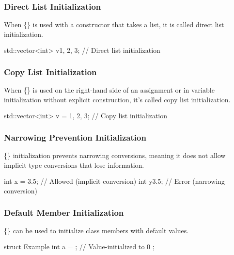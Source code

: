 \documentclass{report}
\begin{document}
    \bigbreak \noindent 
    \subsubsection{Direct List Initialization}
    \bigbreak \noindent 
    When \{\} is used with a constructor that takes a list, it is called direct list initialization.
    \bigbreak \noindent 
    \begin{cppcode}
    std::vector<int> v{1, 2, 3}; // Direct list initialization
    \end{cppcode}

    \bigbreak \noindent 
    \subsubsection{Copy List Initialization}
    \bigbreak \noindent 
    When \{\} is used on the right-hand side of an assignment or in variable initialization without explicit construction, it's called copy list initialization.
    \bigbreak \noindent 
    \begin{cppcode}
    std::vector<int> v = {1, 2, 3}; // Copy list initialization
    \end{cppcode}
    
    \bigbreak \noindent 
    \subsubsection{Narrowing Prevention Initialization}
    \bigbreak \noindent 
    \{\} initialization prevents narrowing conversions, meaning it does not allow implicit type conversions that lose information.
    \bigbreak \noindent 
    \begin{cppcode}
        int x = 3.5;  // Allowed (implicit conversion)
        int y{3.5};   // Error (narrowing conversion)
    \end{cppcode}


    \bigbreak \noindent 
    \subsubsection{ Default Member Initialization}
    \bigbreak \noindent 
    \{\} can be used to initialize class members with default values.
    \bigbreak \noindent 
    \begin{cppcode}
        struct Example {
            int a = {};  // Value-initialized to 0
        };
    \end{cppcode}

    \bigbreak \noindent 
\end{document}
